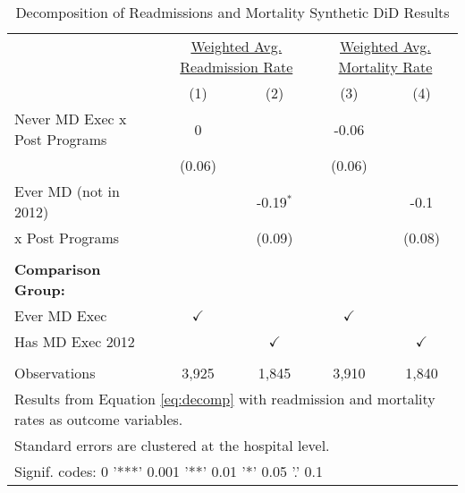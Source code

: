 \begin{table}[ht!]

\caption{\label{tab:MD_noMD_readmort_decomp_synth}Decomposition of Readmissions and Mortality Synthetic DiD Results}
\centering
\begin{tabular}[t]{lcccc}
\toprule
\multicolumn{1}{c}{ } & \multicolumn{2}{c}{\underline{Weighted Avg. Readmission Rate}} & \multicolumn{2}{c}{\underline{Weighted Avg. Mortality Rate}} \\
\addlinespace
 & (1) & (2) & (3) & (4)\\
\midrule
Never MD Exec x Post Programs & 0 &  & -0.06 & \\
 & (0.06) &  & (0.06) & \\
Ever MD (not in 2012) &  & -0.19$^{*}$ &  & -0.1\\
 \hspace{3mm} x Post Programs &  & (0.09) &  & (0.08)\\
 &  &  &  & \\
\addlinespace
\textbf{Comparison Group:} &  &  &  & \\
Ever MD Exec & $\checkmark$ &  & $\checkmark$ & \\
Has MD Exec 2012 &  & $\checkmark$ &  & $\checkmark$\\
 &  &  &  & \\
Observations & 3,925 & 1,845 & 3,910 & 1,840\\
\bottomrule
\multicolumn{5}{l}{\textsuperscript{} Results from Equation \ref{eq:decomp} with readmission and mortality rates as outcome variables.}\\
\multicolumn{5}{l}{\textsuperscript{} Standard errors are clustered at the hospital level.}\\
\multicolumn{5}{l}{\textsuperscript{} Signif. codes: 0 '***' 0.001 '**' 0.01 '*' 0.05 '.' 0.1}\\
\end{tabular}
\end{table}
